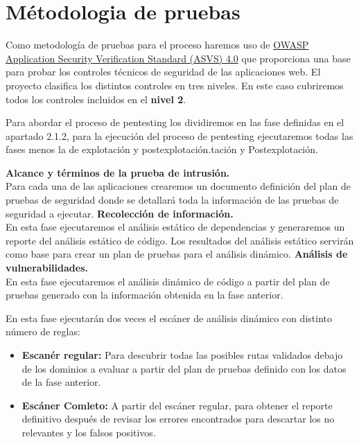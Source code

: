 \section{Métodologia de pruebas} 

Como metodología de pruebas para el proceso haremos uso 
de \href{https://owasp.org/www-pdf-archive/OWASP_Application_Security_Verification_Standard_4.0-en.pdf}{OWASP Application Security Verification Standard (ASVS) 4.0} 
que proporciona una base para probar los controles técnicos de seguridad de las aplicaciones web. El proyecto clasifica
 los distintos controles en tres niveles. En este caso cubriremos todos los controles incluidos en el \textbf{nivel 2}.

 Para abordar el proceso de pentesting los dividiremos en las fase definidas en el 
 apartado 2.1.2, para la ejecución del proceso de pentesting ejecutaremos todas las fases menos la 
 de explotación y postexplotación.tación y Postexplotación.

\textbf{Alcance y términos de la prueba de intrusión.}\\
 Para cada una de las aplicaciones crearemos un documento definición del plan de pruebas de seguridad donde se
detallará toda la información de las pruebas de seguridad a ejecutar.
\textbf{Recolección de información.}\\
En esta fase ejecutaremos el análisis estático de dependencias y generaremos un reporte del análisis estático de código. Los resultados del 
análisis estático servirán como base para crear un plan de pruebas para el análisis dinámico.
\textbf{Análisis de vulnerabilidades.}\\
En esta fase ejecutaremos el análisis dinámico de código a partir del plan de pruebas generado con la información obtenida en la fase anterior.

En esta fase ejecutarán dos veces el escáner de análisis dinámico con distinto número de reglas:

\begin{itemize}
    \item \textbf{Escanér regular:} Para descubrir todas las posibles rutas validados debajo de los dominios 
    a evaluar a partir del plan de pruebas definido con los datos de la fase anterior.
    \item \textbf{Escáner Comleto:} A partir del escáner regular, para obtener el reporte definitivo después 
    de revisar los errores encontrados para descartar los no relevantes y los falsos positivos.
\end{itemize}

